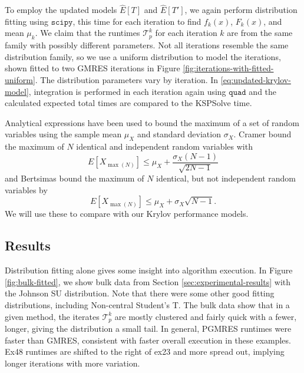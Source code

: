 \documentclass[num-refs]{wiley-article}
\begin{document}
To employ the updated models $\widehat{E}[T]$ and $\widehat{E}[T']$, we again perform distribution fitting using ${\texttt{scipy}}$, this time for each iteration to find  $f_k(x)$, $F_k(x)$, and mean $\mu_k$.
We claim that the runtimes $\mathcal{T}^k_p$ for each iteration $k$ are from the same family with possibly different parameters. 
Not all iterations resemble the same distribution family, so we use a uniform distribution to model the iterations, shown fitted to two GMRES iterations in Figure \ref{fig:iterations-with-fitted-uniform}. 
The distribution parameters vary by iteration.
In \eqref{eq:updated-krylov-model}, integration is performed in each iteration again using ${\texttt{quad}}$ and the calculated expected total times are compared to the KSPSolve time.




Analytical expressions have been used \cite{seelam2010extreme} to bound the maximum of a set of random variables using the sample mean $\mu_X$ and standard deviation $\sigma_X$.  Cramer \cite{cramer2016mathematical, david2004order} bound the maximum of $N$ identical and independent random variables  with
\begin{equation}
E[X_{\max{(N)}}] \leq \mu_X + \frac{\sigma_X (N-1)}{\sqrt{2N-1}}
\end{equation}
and Bertsimas \cite{bertsimas2006tight} bound the maximum of $N$ identical, but not independent random variables by
\begin{equation}
E[X_{\max{(N)}}] \leq \mu_X + \sigma_X \sqrt{N-1}.
\end{equation}
We will use these to compare with our Krylov performance models.

\subsection{Results}

Distribution fitting alone gives some insight into algorithm execution. 
In Figure \ref{fig:bulk-fitted}, we show bulk data from Section \ref{sec:experimental-results} with the Johnson SU distribution. Note that there were some other good fitting distributions, including Non-central Student's T.
The bulk data show that in a given method, the iterates $\mathcal{T}^k_p$ are mostly clustered and fairly quick with a fewer, longer, giving the distribution a small tail.
In general, PGMRES runtimes were faster than GMRES, consistent with faster overall execution in these examples. Ex48 runtimes are shifted to the right of ex23 and more spread out, implying longer iterations with more variation. 
\end{document}
